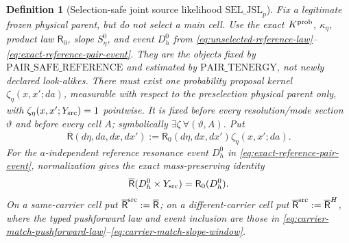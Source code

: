 \documentclass[11pt]{article}
\newtheorem{definition}[theorem]{Definition}
\begin{document}
\begin{definition}[Selection-safe joint source likelihood
$\mathrm{SEL\_JSL}_{p}$]
\label{def:joint-source-likelihood}
Fix a legitimate frozen physical parent, but do not select a main cell.
Use the exact $K^{\rm prob}$, $\kappa_\eta$, product law $\mathsf R_0$,
slope $S_\eta^0$, and event $D_h^0$ from
\eqref{eq:unselected-reference-law}--\eqref{eq:exact-reference-pair-event}.
They are the objects fixed by $\mathrm{PAIR\_SAFE\_REFERENCE}$ and estimated
by $\mathrm{PAIR\_TENERGY}$, not newly declared look-alikes.  There must exist one probability proposal kernel
$\zeta_\eta(x,x';da)$, measurable with respect to the preselection physical
parent only, with $\zeta_\eta(x,x';Y_{\rm src})=1$ pointwise.  It is fixed
before every resolution/mode section $\vartheta$ and before every cell $A$;
symbolically $\exists\zeta\ \forall(\vartheta,A)$.  Put
\begin{equation}
\label{eq:proposal-lift}
 \overline{\mathsf R}(d\eta,da,dx,dx')
 :=\mathsf R_0(d\eta,dx,dx')\zeta_\eta(x,x';da).
\end{equation}
For the $a$-independent reference resonance event $D_h^0$ in
\eqref{eq:exact-reference-pair-event}, normalization gives the exact
mass-preserving identity
\begin{equation}
\label{eq:proposal-preserves-reference-energy}
\overline{\mathsf R}(D_h^0\times Y_{\rm src})=\mathsf R_0(D_h^0).
\end{equation}
On a same-carrier cell put
$\overline{\mathsf R}^{\rm src}:=\overline{\mathsf R}$; on a
different-carrier cell put
$\overline{\mathsf R}^{\rm src}:=\overline{\mathsf R}^{H}$, where the typed
pushforward law and event inclusion are those in
\eqref{eq:carrier-match-pushforward-law}--\eqref{eq:carrier-match-slope-window}.


\end{definition}
\end{document}
